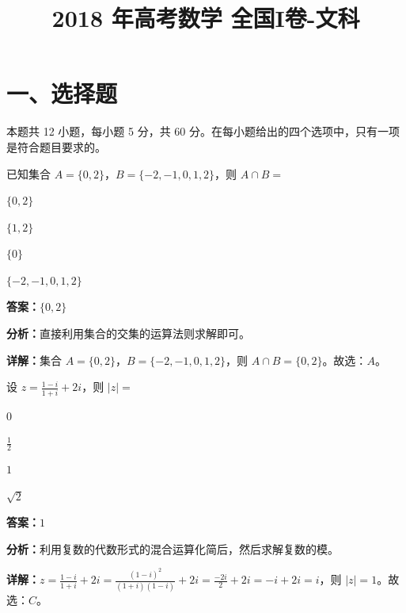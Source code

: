 ﻿\title{2018 年高考数学 全国I卷-文科}
\date{}
\maketitle

\section*{一、选择题}
本题共 12 小题，每小题 5 分，共 60 分。在每小题给出的四个选项中，只有一项是符合题目要求的。

\begin{question}[points=5]
已知集合 $A=\{0,2\}$，$B=\{-2,-1,0,1,2\}$，则 $A\cap B=$
\begin{choices}
  \item $\{0,2\}$
  \item $\{1,2\}$
  \item $\{0\}$
  \item $\{-2,-1,0,1,2\}$
\end{choices}
\begin{solution}
\textbf{答案：}$\{0,2\}$

\textbf{分析：}直接利用集合的交集的运算法则求解即可。

\textbf{详解：}集合 $A=\{0,2\}$，$B=\{-2,-1,0,1,2\}$，则 $A\cap B=\{0,2\}$。故选：$A$。
\end{solution}
\end{question}

\begin{question}[points=5]
设 $z=\frac{1-i}{1+i}+2i$，则 $|z|=$
\begin{choices}
  \item $0$
  \item $\frac{1}{2}$
  \item $1$
  \item $\sqrt{2}$
\end{choices}
\begin{solution}
\textbf{答案：}$1$

\textbf{分析：}利用复数的代数形式的混合运算化简后，然后求解复数的模。

\textbf{详解：}$z=\frac{1-i}{1+i}+2i=\frac{(1-i)^2}{(1+i)(1-i)}+2i=\frac{-2i}{2}+2i=-i+2i=i$，则 $|z|=1$。故选：$C$。
\end{solution}
\end{question}

